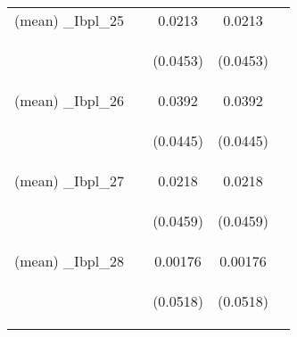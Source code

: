 \documentclass[]{article}
\begin{document}
\begin{center}
\begin{tabular}{lcccc}
(mean) \_Ibpl\_25 &  & 0.0213 & 0.0213 &  \\
\vspace{4pt} & \begin{footnotesize}\end{footnotesize} & \begin{footnotesize}(0.0453)\end{footnotesize} & \begin{footnotesize}(0.0453)\end{footnotesize} & \begin{footnotesize}\end{footnotesize} \\
(mean) \_Ibpl\_26 &  & 0.0392 & 0.0392 &  \\
\vspace{4pt} & \begin{footnotesize}\end{footnotesize} & \begin{footnotesize}(0.0445)\end{footnotesize} & \begin{footnotesize}(0.0445)\end{footnotesize} & \begin{footnotesize}\end{footnotesize} \\
(mean) \_Ibpl\_27 &  & 0.0218 & 0.0218 &  \\
\vspace{4pt} & \begin{footnotesize}\end{footnotesize} & \begin{footnotesize}(0.0459)\end{footnotesize} & \begin{footnotesize}(0.0459)\end{footnotesize} & \begin{footnotesize}\end{footnotesize} \\
(mean) \_Ibpl\_28 &  & 0.00176 & 0.00176 &  \\
\vspace{4pt} & \begin{footnotesize}\end{footnotesize} & \begin{footnotesize}(0.0518)\end{footnotesize} & \begin{footnotesize}(0.0518)\end{footnotesize} & \begin{footnotesize}\end{footnotesize} \\

\end{tabular}
\end{center}
\end{document}
